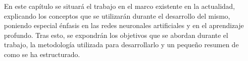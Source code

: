 \documentclass[a4paper, 12pt, oneside]{book}
\begin{document}
En este capítulo se situará el trabajo en el marco existente en la actualidad, explicando los conceptos que se utilizarán durante el desarrollo del mismo, poniendo especial énfasis en las redes neuronales artificiales y en el aprendizaje profundo. Tras esto, se expondrán los objetivos que se abordan durante el trabajo, la metodología utilizada para desarrollarlo y un pequeño resumen de como se ha estructurado.

\begin{comment}
\section{Contexto y motivación}
\lhead[\thepage]{\thesection. Contexto y motivación}

Una de las fuentes de inspiración matemáticas ha sido el continuo intento de formalizar el pensamiento humano. La complejidad para simular acciones humanas frente a otras teorías matemáticas ha hecho que se separen los campos de estudio y aplicación.\\

Comenzando en la década de 1940 y con una gran aceleración en la década de 1980, se ha hecho un gran esfuerzo por modelar la cognición utilizando formalismos basados en modelos cada vez más sofisticados de la fisiología de las neuronas. Algunas ramas de este trabajo se siguen enfocando en la teoría biológica y psicológica, pero como ocurrió en el pasado, estos formalismos están adquiriendo una vida matemática y de aplicación propia. Muchas variedades de redes adaptativas han demostrado ser prácticas enfrentándose a problemas de gran dificultad, convirtiendo el estudio de sus propiedades matemáticas y computacionales en un campo muy interesante de estudio.\\

La investigación en el campo de las redes neuronales ha atraído cada vez más atención en los años recientes. Desde 1943, cuando Warren McCulloch y Walter Pitts presentaron el primer modelo de neuronas artificiales, nuevas y más sofisticadas propuestas se han hecho década tras década. El análisis matemático de estas propuestas ha resuelto algunos de los misterios planteados por los nuevos modelos pero también ha dejado muchas preguntas abiertas para futuras investigaciones. Cabe destacar que el estudio de las neuronas, sus interconexiones y su papel dentro del cerebro es uno de los campos de investigación más dinámicos e importantes en la biología moderna. Esta relevancia se puede ilustrar señalando que entre los años 1901 y 1991, aproximadamente el 10\% de los Premios Nobel de Fisiología y Medicina fueron otorgados a científicos que contribuyeron a la comprensión del cerebro. No es una exageración decir que se ha aprendido más del sistema nervioso en los últimos 50 años que nunca antes.\\


\end{comment}
\end{document}

